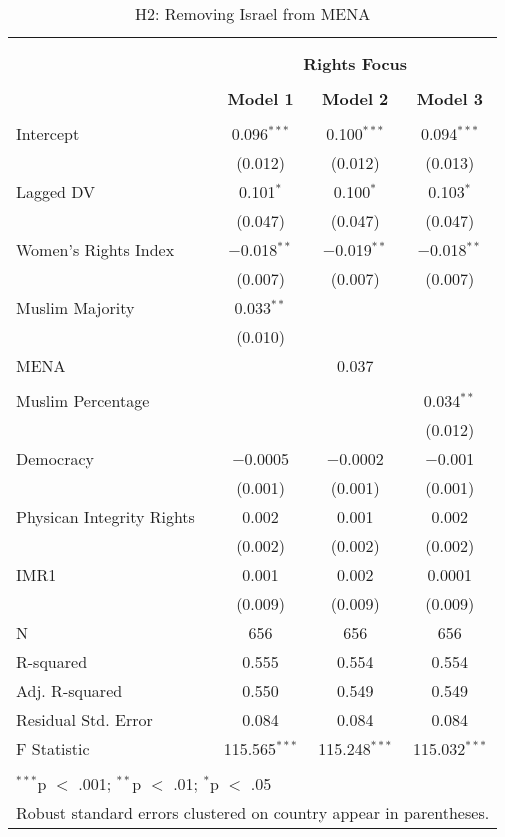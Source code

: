 
\begin{table}[!htbp] \centering 
  \caption{H2: Removing Israel from MENA} 
  \label{} 
\begin{tabular}{@{\extracolsep{5pt}}lccc} 
\\[-1.8ex]\hline \\[-1.8ex] 
\\[-1.8ex] & \multicolumn{3}{c}{\textbf{Rights Focus}} \\ 
\\[-1.8ex] & \textbf{Model 1} & \textbf{Model 2} & \textbf{Model 3}\\ 
\hline \\[-1.8ex] 
 Intercept & 0.096$^{***}$ & 0.100$^{***}$ & 0.094$^{***}$ \\ 
  & (0.012) & (0.012) & (0.013) \\ 
  Lagged DV & 0.101$^{*}$ & 0.100$^{*}$ & 0.103$^{*}$ \\ 
  & (0.047) & (0.047) & (0.047) \\ 
  Women's Rights Index & $-$0.018$^{**}$ & $-$0.019$^{**}$ & $-$0.018$^{**}$ \\ 
  & (0.007) & (0.007) & (0.007) \\ 
  Muslim Majority & 0.033$^{**}$ &  &  \\ 
  & (0.010) &  &  \\ 
  MENA &  & 0.037 &  \\ 
  &  &  &  \\ 
  Muslim Percentage &  &  & 0.034$^{**}$ \\ 
  &  &  & (0.012) \\ 
  Democracy & $-$0.0005 & $-$0.0002 & $-$0.001 \\ 
  & (0.001) & (0.001) & (0.001) \\ 
  Physican Integrity Rights & 0.002 & 0.001 & 0.002 \\ 
  & (0.002) & (0.002) & (0.002) \\ 
  IMR1 & 0.001 & 0.002 & 0.0001 \\ 
  & (0.009) & (0.009) & (0.009) \\ 
 N & 656 & 656 & 656 \\ 
R-squared & 0.555 & 0.554 & 0.554 \\ 
Adj. R-squared & 0.550 & 0.549 & 0.549 \\ 
Residual Std. Error & 0.084 & 0.084 & 0.084 \\ 
F Statistic & 115.565$^{***}$ & 115.248$^{***}$ & 115.032$^{***}$ \\ 
\hline \\[-1.8ex] 
\multicolumn{4}{l}{$^{***}$p $<$ .001; $^{**}$p $<$ .01; $^{*}$p $<$ .05} \\ 
\multicolumn{4}{l}{Robust standard errors clustered on country appear in parentheses.} \\ 
\end{tabular} 
\end{table} 
